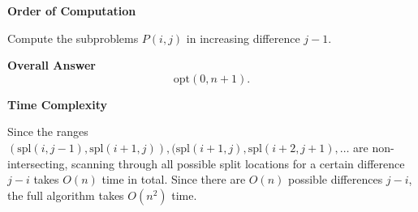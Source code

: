 \documentclass{article}
\begin{document}
\begin{solution}
\begin{enumerate}[label = (\alph*)]
    \textbf{Order of Computation}

    Compute the subproblems $P(i,j)$ in increasing difference $j-1$.

    \textbf{Overall Answer}
    $$ \mathrm{opt}(0,n+1).$$

    \textbf{Time Complexity}

    Since the ranges $(\mathrm{spl}(i,j-1), \mathrm{spl}(i+1,j)), (\mathrm{spl}(i+1, j), \mathrm{spl}(i+2, j+1), \dots$ are non-intersecting, scanning through all possible split locations 
    for a certain difference $j-i$ takes $O(n)$ time in total. 
    Since there are $O(n)$ possible differences $j-i$, the full algorithm takes $O(n^2)$ time.

\end{enumerate}
\end{solution}
\end{document}
